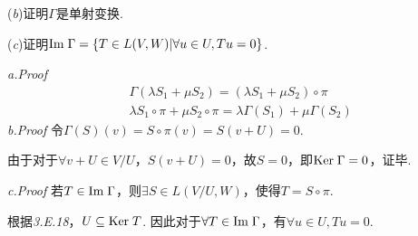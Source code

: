 (\textit{b})证明\(\Gamma\)是单射变换.

(\textit{c})证明\(\mathrm{Im \;}  \Gamma=\{T \in L(V,W)|\forall u \in U,Tu=0 \}\).

\textit{a.Proof}
    \begin{align*}
        &\Gamma(\lambda S_1+\mu S_2)=(\lambda S_1+\mu S_2) \circ \pi \\
        &\lambda S_1 \circ \pi+\mu S_2 \circ \pi=\lambda \Gamma(S_1)+\mu \Gamma(S_2)
    \end{align*}
\textit{b.Proof}
令\(\Gamma(S)(v)=S \circ \pi(v)=S(v+U)=0\).

由于对于\(\forall v+U \in V/U\)，\(S(v+U)=0\)，故\(S=0\)，即\(\mathrm{Ker \;}  \Gamma=0\)，证毕.

\textit{c.Proof}
若\(T \in \mathrm{Im \;}  \Gamma\)，则\(\exists S \in L(V/U,W)\)，使得\(T=S \circ \pi\).

根据\textit{3.E.18}，\(U \subseteq \mathrm{Ker \;} T\).
因此对于\(\forall T \in \mathrm{Im \;} \Gamma\)，有\(\forall u \in U,Tu=0\).

